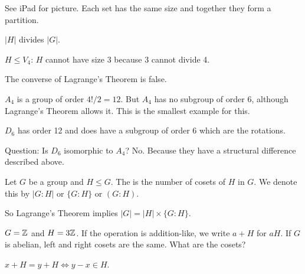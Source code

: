 \documentclass[class=article,crop=false]{standalone}
\begin{document}
See iPad for picture. Each set has the same size and together they form a partition.
\begin{thm}[]
$ |H|$ divides  $ |G|$.
\end{thm}

$ H \leq V_4$:  $ H$ cannot have size 3 because 3 cannot divide 4.

\begin{note}[]
The converse of Lagrange's Theorem is false.
\end{note}
\begin{eg}[]
$ A_4$ is a group of order $ 4!/2= 12$. But  $ A_4$ has no subgroup of order 6, although Lagrange's Theorem allows it. This is the smallest example for this.
\end{eg}
\begin{eg}[]
$ D_6$ has order 12 and does have a subgroup of order 6 which are the rotations.
\end{eg}

Question: Is $ D_6$ isomorphic to $ A_4$? No. Because they have a structural difference described above.

\begin{defn}[index]
	Let $ G$ be a group and  $ H \leq G$. The   is the number of cosets of $ H$ in  $ G$. We denote this by $|G:H|$ or $ \{G:H\} $ or $ (G:H)$.  
\end{defn}

So Lagrange's Theorem implies $ |G|=|H| \times \{G:H\} $.

\begin{eg}
$ G= \mathbb{Z}$ and  $ H=3 \mathbb{Z}$. If the operation is addition-like, we write $ a+H$ for  $ aH$.  If $ G$  is abelian, left and right cosets are the same. What are the cosets?

$ x+H = y+H \iff y-x \in H$.
\end{eg}
\end{document}
